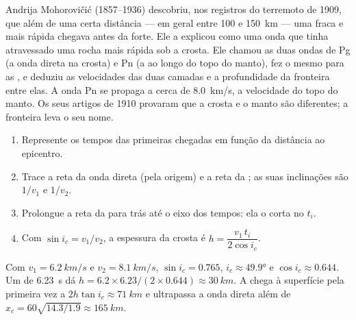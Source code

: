 \begin{history}
Andrija Mohorovičić (1857--1936) descobriu, nos registros do terremoto de
1909, que além de uma certa distância --- em geral entre 100 e
\qty{150}{km} --- uma  fraca e mais rápida chegava antes da 
forte. Ele a explicou como uma onda que tinha atravessado uma rocha mais
rápida sob a crosta. Ele chamou as duas ondas de Pg (a onda direta na
crosta) e Pn (a  ao longo do topo do manto), fez o mesmo para as
, e deduziu as velocidades das duas camadas e a profundidade da
fronteira entre elas. A onda Pn se propaga a cerca de \qty{8.0}{km/s}, a
velocidade do topo do manto. Os seus artigos de 1910 provaram que a crosta e
o manto são diferentes; a fronteira leva o seu nome.
\end{history}

\begin{method}\label{met:g11:seismic-structure:moho}
\begin{enumerate}
  \item Represente os tempos das primeiras chegadas em função da distância
        ao epicentro.
  \item Trace a reta da onda direta (pela origem) e a reta da ;
        as suas inclinações são $1/v_1$ e $1/v_2$.
  \item Prolongue a reta da  para trás até o eixo dos tempos:
        ela o corta no  $t_i$.
  \item Com $\sin i_c = v_1/v_2$, a espessura da crosta é
        $h = \dfrac{v_1\,t_i}{2\cos i_c}$.
\end{enumerate}
\end{method}

\begin{example}\label{ex:g11:seismic-structure:moho}
Com $v_1 = \qty{6.2}{km/s}$ e $v_2 = \qty{8.1}{km/s}$, $\sin i_c = 0.765$,
$i_c \approx \ang{49.9}$ e $\cos i_c \approx 0.644$. Um 
de \qty{6.23}{s} dá $h = 6.2 \times 6.23/(2 \times 0.644) \approx
\qty{30}{km}$. A  chega à superfície pela primeira vez a
$2h\tan i_c \approx \qty{71}{km}$ e ultrapassa a onda direta além de
$x_c = 60\sqrt{14.3/1.9} \approx \qty{165}{km}$.
\end{example}


